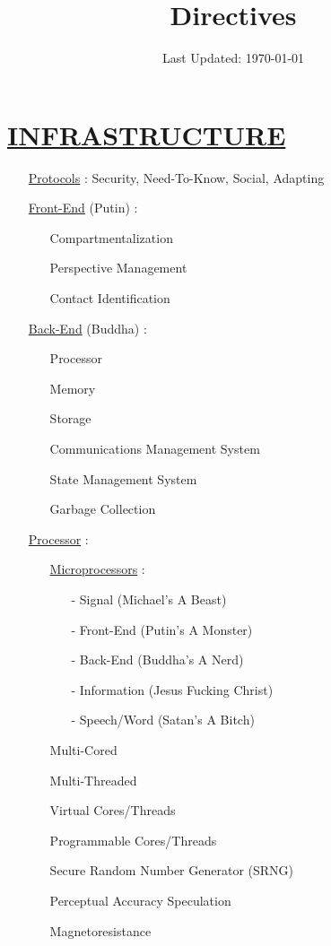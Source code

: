 \documentclass[11pt]{article}
\title{	
	\normalfont \normalsize 
	\huge Directives
}
\date{Last Updated: \normalsize\today}
\begin{document}
\maketitle
\section*{\ul{INFRASTRUCTURE}}
\begin{enumerate}
	\item[] \ul{Protocols} : Security, Need-To-Know, Social, Adapting
	
	\item[] \ul{Front-End} (Putin) :
	\begin{enumerate}
		\item[] Compartmentalization
		\item[] Perspective Management
		\item[] Contact Identification
	\end{enumerate}

	\item[] \ul{Back-End} (Buddha) :
	\begin{enumerate}
		\item[] Processor
		\item[] Memory
		\item[] Storage
		\item[] Communications Management System
		\item[] State Management System
		\item[] Garbage Collection
	\end{enumerate}

	\item[] \ul{Processor} :
	\begin{enumerate}
		\item[] \ul{Microprocessors} :
		\begin{enumerate}
			\item[-] Signal (Michael's A Beast)
			\item[-] Front-End (Putin's A Monster)
			\item[-] Back-End (Buddha's A Nerd)
			\item[-] Information (Jesus Fucking Christ)
			\item[-] Speech/Word (Satan's A Bitch)
		\end{enumerate}
	
		\item[] Multi-Cored
		\item[] Multi-Threaded
		\item[] Virtual Cores/Threads
		\item[] Programmable Cores/Threads
		\item[] Secure Random Number Generator (SRNG)
		\item[] Perceptual Accuracy Speculation
		\item[] Magnetoresistance
	\end{enumerate}
	

\end{enumerate}
\end{document}
